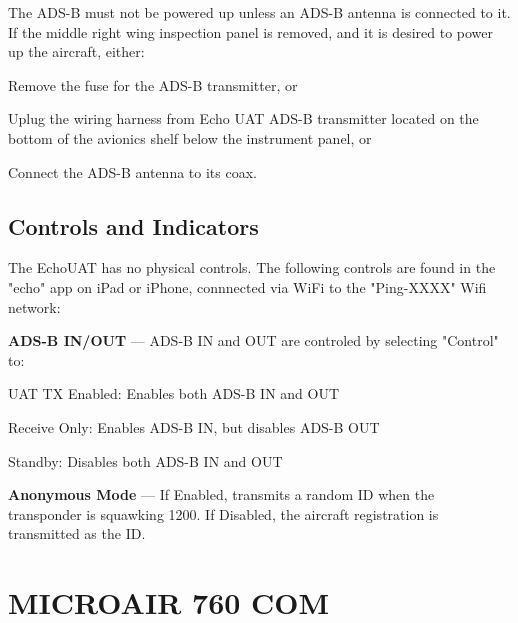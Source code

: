 \begin{Note}[CAUTION]
The ADS-B must not be powered up unless an ADS-B antenna is connected to it.  If the middle right wing inspection panel is removed, and it is desired to power up the aircraft, either:
\begin{enumerate*}
	\item Remove the fuse for the ADS-B transmitter, or
	\item Uplug the wiring harness from Echo UAT ADS-B transmitter located on the bottom of the avionics shelf below the instrument panel, or
	\item Connect the ADS-B antenna to its coax.
\end{enumerate*}
\end{Note}

\subsection*{Controls and Indicators}
The EchoUAT has no physical controls.  The following controls are found in the "echo" app on iPad or iPhone, connnected via WiFi to the "Ping-XXXX" Wifi network:

\textbf{ADS-B IN/OUT} --- ADS-B IN and OUT are controled by selecting "Control" to:

\begin{itemize*}
\item UAT TX Enabled: Enables both ADS-B IN and OUT
\item Receive Only: Enables ADS-B IN, but disables ADS-B OUT
\item Standby: Disables both ADS-B IN and OUT
\end{itemize*}

\textbf{Anonymous Mode} --- If Enabled, transmits a random ID when the transponder is squawking 1200.  If Disabled, the aircraft registration is transmitted as the ID.

\section{MICROAIR 760 COM}



